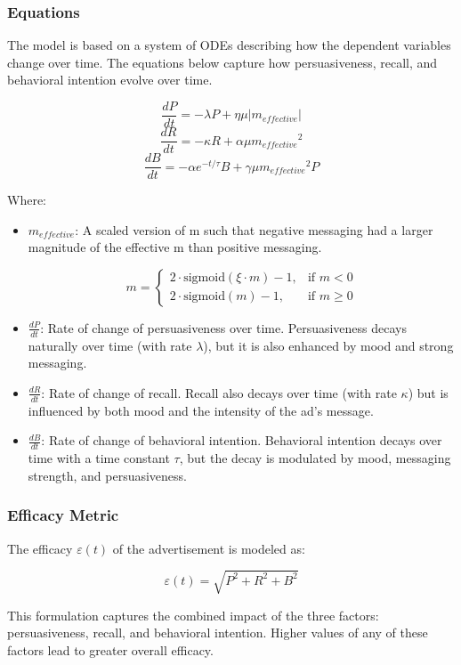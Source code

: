 \documentclass[12pt]{beamer}
\begin{document}
\begin{frame}
\frametitle{Equations}
The model is based on a system of ODEs describing how the dependent variables change over time. The equations below capture how persuasiveness, recall, and behavioral intention evolve over time.

\[
\frac{dP}{dt} = -\lambda P + \eta \mu |m_{effective}|
\]
\[
\frac{dR}{dt} = -\kappa R + \alpha \mu {m_{effective}}^2
\]
\[
\frac{dB}{dt} = -\alpha e^{-t/\tau} B + \gamma \mu {m_{effective}}^2 P
\]
\end{frame}
\begin{frame}
Where:
\begin{itemize}
    \item $m_{effective}$: A scaled version of m such that negative messaging had a larger magnitude of the effective m than positive messaging.

\[
m = 
\begin{cases} 
      2 \cdot \text{sigmoid}(\xi \cdot m) - 1, & \text{if } m < 0 \\
      2 \cdot \text{sigmoid}(m) - 1, & \text{if } m \geq 0 
   \end{cases}
\]


    \item \( \frac{dP}{dt} \): Rate of change of persuasiveness over time. Persuasiveness decays naturally over time (with rate \( \lambda \)), but it is also enhanced by mood and strong messaging.
    \item \( \frac{dR}{dt} \): Rate of change of recall. Recall also decays over time (with rate \( \kappa \)) but is influenced by both mood and the intensity of the ad's message.
    \item \( \frac{dB}{dt} \): Rate of change of behavioral intention. Behavioral intention decays over time with a time constant \( \tau \), but the decay is modulated by mood, messaging strength, and persuasiveness.
\end{itemize}
\end{frame}


\begin{frame}
\frametitle{Efficacy Metric}
The efficacy \( \varepsilon(t) \) of the advertisement is modeled as:

\[
\varepsilon(t) = \sqrt{P^2 + R^2 + B^2}
\]

This formulation captures the combined impact of the three factors: persuasiveness, recall, and behavioral intention. Higher values of any of these factors lead to greater overall efficacy.
\end{frame}
\end{document}
